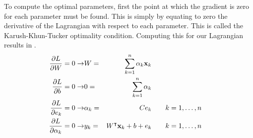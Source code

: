 To compute the optimal parameters, first the point at which the gradient is zero for each parameter must be found. This is simply by equating to zero the derivative of the Lagrangian with respect to each parameter. This is called the Karush-Khun-Tucker optimality condition. Computing this for our Lagrangian results in .
\begin{subequations}
  \begin{align}
    \pdv{L}{W} = 0 \rightarrow          & W           = & \sum_{k=1}^{n}\alpha_{k}\vb{x}_{k}                      \label{eq:lssvr_kkt_w}                                             \\
    \pdv{L}{b} = 0 \rightarrow          & 0           = & \sum_{k=1}^{n}\alpha_{k}                                \label{eq:lssvr_kkt_b}                                             \\
    \pdv{L}{e_{k}} = 0 \rightarrow      & \alpha_{k}  = & C e_{k}                                                                        & \qquad k=1,\dots,n \label{eq:lssvr_kkt_e} \\
    \pdv{L}{\alpha_{k}} = 0 \rightarrow & y_{k}       = & W^{\intercal}\vb{x}_{k}+b+e_{k}                                                & \qquad k=1,\dots,n \label{eq:lssvr_kkt_a}
  \end{align}\label{eq:lssvr_kkt}
\end{subequations}

